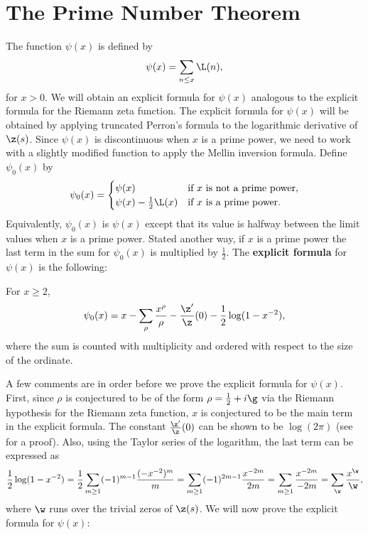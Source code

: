   \section{The Prime Number Theorem}
    The function $\psi(x)$ is defined by
    \[
      \psi(x) = \sum_{n \le x}\L(n),
    \]
    for $x > 0$. We will obtain an explicit formula for $\psi(x)$ analogous to the explicit formula for the Riemann zeta function. The explicit formula for $\psi(x)$ will be obtained by applying truncated Perron's formula to the logarithmic derivative of $\z(s)$. Since $\psi(x)$ is discontinuous when $x$ is a prime power, we need to work with a slightly modified function to apply the Mellin inversion formula. Define $\psi_{0}(x)$ by
    \[
      \psi_{0}(x) = \begin{cases} \psi(x) & \text{if $x$ is not a prime power}, \\ \psi(x)-\frac{1}{2}\L(x) & \text{if $x$ is a prime power}. \end{cases}
    \]
    Equivalently, $\psi_{0}(x)$ is $\psi(x)$ except that its value is halfway between the limit values when $x$ is a prime power. Stated another way, if $x$ is a prime power the last term in the sum for $\psi_{0}(x)$ is multiplied by $\frac{1}{2}$. The \textbf{explicit formula} for $\psi(x)$ is the following:

    \begin{theorem}
      For $x \ge 2$,
      \[
        \psi_{0}(x) = x-\sum_{\rho}\frac{x^{\rho}}{\rho}-\frac{\z'}{\z}(0)-\frac{1}{2}\log(1-x^{-2}),
      \]
      where the sum is counted with multiplicity and ordered with respect to the size of the ordinate.
    \end{theorem}

    A few comments are in order before we prove the explicit formula for $\psi(x)$. First, since $\rho$ is conjectured to be of the form $\rho = \frac{1}{2}+i\g$ via the Riemann hypothesis for the Riemann zeta function, $x$ is conjectured to be the main term in the explicit formula. The constant $\frac{\z'}{\z}(0)$ can be shown to be $\log(2\pi)$ (see \cite{davenport1980multiplicative} for a proof). Also, using the Taylor series of the logarithm, the last term can be expressed as
    \[
      \frac{1}{2}\log(1-x^{-2}) = \frac{1}{2}\sum_{m \ge 1}(-1)^{m-1}\frac{(-x^{-2})^{m}}{m} = \sum_{m \ge 1}(-1)^{2m-1}\frac{x^{-2m}}{2m} = \sum_{m \ge 1}\frac{x^{-2m}}{-2m} = \sum_{\w}\frac{x^{\w}}{\w},
    \]
    where $\w$ runs over the trivial zeros of $\z(s)$. We will now prove the explicit formula for $\psi(x)$:

